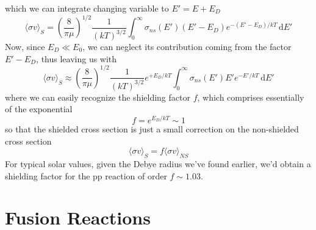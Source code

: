 which we can integrate changing variable to $E' = E+E_{D}$
\begin{equation*}
    \langle \sigma v\rangle_{S} = \left(\frac{8}{\pi\mu}\right)^{1/2}\frac{1}{(kT)^{3/2}}\int_{0}^{\infty}\sigma_{ns}(E')(E'-E_{D})e^{-(E'-E_{D})/kT}\,\text{d}E'
\end{equation*}
Now, since $E_{D}\ll E_{0}$, we can neglect its contribution coming from the factor $E'-E_{D}$, thus leaving us with 
\begin{equation*}
     \langle \sigma v\rangle_{S} \approx \left(\frac{8}{\pi\mu}\right)^{1/2}\frac{1}{(kT)^{3/2}}e^{+E_{D}/kT}\int_{0}^{\infty}\sigma_{ns}(E')E'e^{-E'/kT}\,\text{d}E'
\end{equation*}
where we can easily recognize the shielding factor $f$, which comprises essentially of the exponential 
\begin{equation}
    f = e^{E_{D}/kT} \sim 1
    \label{eq:weakshieldingfactor}
\end{equation}
so that the shielded cross section is just a small correction on the non-shielded cross section
\begin{equation*}
    \langle \sigma v\rangle_{S} = f\langle \sigma v\rangle_{NS}
\end{equation*}
For typical solar values, given the Debye radius we've found earlier, we'd obtain a shielding factor for the pp reaction of order $f\sim 1.03$.

\section{Fusion Reactions}

